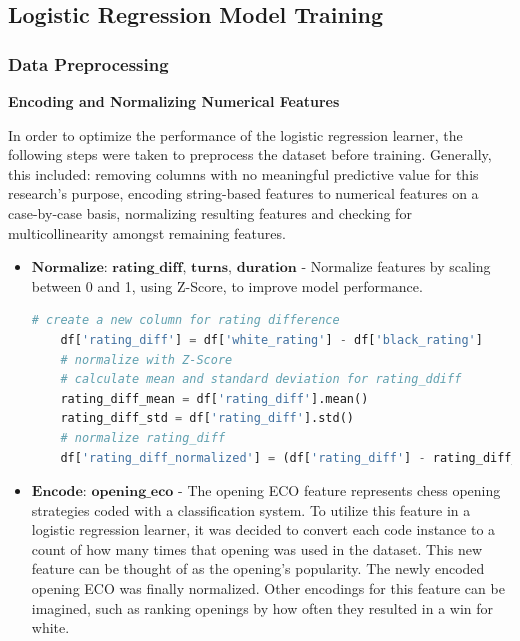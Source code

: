 \documentclass[12pt]{article}
\begin{document}
\subsection{Logistic Regression Model Training}

\subsubsection{Data Preprocessing}

\noindent\textbf{Encoding and Normalizing Numerical Features}

In order to optimize the performance of the logistic regression learner, the following steps were taken to preprocess the dataset before training. Generally, this included: removing columns with no meaningful predictive value for this research's purpose, encoding string-based features to numerical features on a case-by-case basis, normalizing resulting features and checking for multicollinearity amongst remaining features.


\begin{itemize}[label={}, leftmargin=0pt]
  \item $\textbf{Normalize: rating\_diff, turns, duration}$ - Normalize features by scaling between 0 and 1, using Z-Score, to improve model performance.

  \begin{lstlisting}[language=Python, caption={example: normalizing ratings}]
    # create a new column for rating difference
    df['rating_diff'] = df['white_rating'] - df['black_rating']
    # normalize with Z-Score
    # calculate mean and standard deviation for rating_ddiff
    rating_diff_mean = df['rating_diff'].mean()
    rating_diff_std = df['rating_diff'].std()
    # normalize rating_diff
    df['rating_diff_normalized'] = (df['rating_diff'] - rating_diff_mean) / rating_diff_std
  \end{lstlisting}

  \item $\textbf{Encode: opening\_eco}$ - The opening ECO feature represents chess opening strategies coded with a classification system. To utilize this feature in a logistic regression learner, it was decided to convert each code instance to a count of how many times that opening was used in the dataset. This new feature can be thought of as the opening's popularity. The newly encoded opening ECO was finally normalized. Other encodings for this feature can be imagined, such as ranking openings by how often they resulted in a win for white.
\end{itemize}
\end{document}
